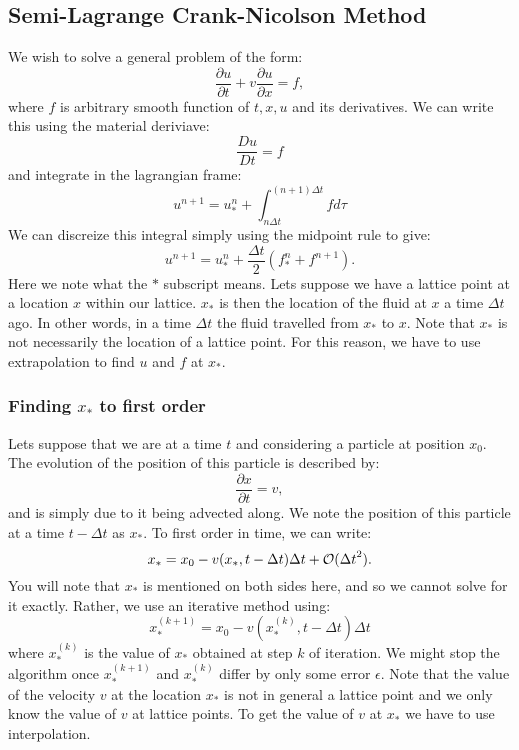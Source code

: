 \documentclass{article}
\begin{document}
\subsection*{Semi-Lagrange Crank-Nicolson Method}
We wish to solve a general problem of the form:
\begin{equation}
	\frac{\partial u}{\partial t} + v \frac{\partial u}{\partial x} = f,
\end{equation}
where $f$ is arbitrary smooth function of $t,x,u$ and its derivatives.
\newline
We can write this using the material deriviave:
\begin{equation}
	\frac{D u}{D t} = f
\end{equation}
and integrate in the lagrangian frame:
\begin{equation}
	u^{n+1} = u^{n}_{*} + \int_{n \Delta t}^{(n+1) \Delta t} f d \tau
\end{equation}
We can discreize this integral simply using the midpoint rule to give:
\begin{equation}
	u^{n+1} = u^{n}_{*} + \frac{\Delta t}{2} (f^{n}_{*} + f^{n+1}).
	\label{u update}
\end{equation}
Here we note what the $*$ subscript means. Lets suppose we have a lattice point at a location $x$ within our lattice. $x_{*}$ is then the location of the fluid at $x$ a time $\Delta t$ ago. In other words, in a time $\Delta t$ the fluid travelled 
from $x_{*}$ to $x$. Note that $x_{*}$ is not necessarily the location of a lattice point. For this reason, we have to use extrapolation to find $u$ and $f$ at $x_*$.


\subsubsection*{Finding $x_*$ to first order}
Lets suppose that we are at a time $t$ and considering a particle at position $x_0$. The evolution of the position of this particle is described by:
\begin{equation}
	\frac{\partial x}{\partial t} = v,
\end{equation}
and is simply due to it being advected along. We note the position of this particle at a time $t-\Delta t$ as $x_*$. To first order in time, we can write:
\begin{equation}
	x_{*} = x_0 - v(x_{*},t-\Delta t) \Delta t + \mathcal{O}({\Delta t}^2).
	\label{x_{*} pure}
\end{equation}
You will note that $x_*$ is mentioned on both sides here, and so we cannot solve for it exactly. Rather, we use an iterative method using:
\begin{equation}
	x_{*}^{(k+1)} = x_0 - v(x_{*}^{(k)},t  - \Delta t ) \Delta t
	\label{x* update}
\end{equation}
where $x_{*}^{(k)}$ is the value of $x_{*}$ obtained at step $k$ of iteration. We might stop the algorithm once $x_{*}^{(k+1)}$ and $x_{*}^{(k)}$ differ by only some error $\epsilon$. Note that the value of the velocity $v$ at the location $x_*$ is not in general a lattice point and we only know the value of $v$ at lattice points. To get the value of $v$ at $x_{*}$ we have to use interpolation.
\end{document}
